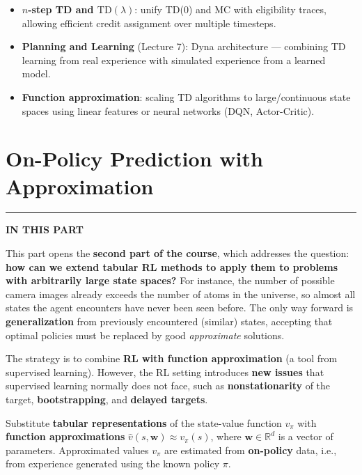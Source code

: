\documentclass[11pt,a4paper]{article}
\theoremstyle{definition}
\theoremstyle{plain}
\theoremstyle{remark}
\newcommand{\partmtoc}{%
  \vspace{2pt}%
  {\color{rlrule}\rule{\linewidth}{0.5pt}}\par\vspace{3pt}%
  {\footnotesize\bfseries\color{rlaccent}IN THIS PART}\par\vspace{2pt}%
  \begingroup
  \etocsetnexttocdepth{subsection}%
  \localtableofcontents
  \endgroup
  \vspace{2pt}{\color{rlrule}\rule{\linewidth}{0.5pt}}\par\vspace{10pt}}
\begin{document}
\begin{tcolorbox}[colback=yellow!10!white, colframe=orange!80!black, title={Looking Ahead}]
\begin{itemize}
    \item \textbf{$n$-step TD and $\text{TD}(\lambda)$}: unify TD(0) and MC with eligibility traces, allowing efficient credit assignment over multiple timesteps.
    \item \textbf{Planning and Learning} (Lecture 7): Dyna architecture — combining TD learning from real experience with simulated experience from a learned model.
    \item \textbf{Function approximation}: scaling TD algorithms to large/continuous state spaces using linear features or neural networks (DQN, Actor-Critic).
\end{itemize}
\end{tcolorbox}


\part{On-Policy Prediction with Approximation}
\partmtoc

This part opens the \textbf{second part of the course}, which addresses the question: \textbf{how can we extend tabular RL methods to apply them to problems with arbitrarily large state spaces?} For instance, the number of possible camera images already exceeds the number of atoms in the universe, so almost all states the agent encounters have never been seen before. The only way forward is \textbf{generalization} from previously encountered (similar) states, accepting that optimal policies must be replaced by good \emph{approximate} solutions.

The strategy is to combine \textbf{RL with function approximation} (a tool from supervised learning). However, the RL setting introduces \textbf{new issues} that supervised learning normally does not face, such as \textbf{nonstationarity} of the target, \textbf{bootstrapping}, and \textbf{delayed targets}.

\begin{tcolorbox}[colback=blue!5!white, colframe=blue!60!black, title={Goal of this Lecture}]
Substitute \textbf{tabular representations} of the state-value function $v_\pi$ with \textbf{function approximations} $\hat{v}(s, \mathbf{w}) \approx v_\pi(s)$, where $\mathbf{w} \in \mathbb{R}^d$ is a vector of parameters. Approximated values $v_\pi$ are estimated from \textbf{on-policy} data, i.e., from experience generated using the known policy $\pi$.
\end{tcolorbox}
\end{document}
